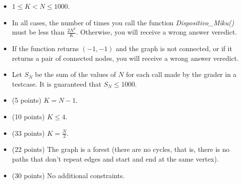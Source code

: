 \documentclass[12pt]{scrartcl}
\begin{document}
        \begin{itemize}
            \item $1 \le K < N \le 1000$.
            \item In all cases, the number of times you call the function \textit{Dispositivo\_Miku()} must be less than $\frac{2N^2}{K}$. Otherwise, you will receive a wrong answer veredict.
            \item If the function returns $(-1, -1)$ and the graph is not connected, or if it returns a pair of connected nodes, you will receive a wrong answer veredict.
            \item Let $S_N$ be the sum of the values of $N$ for each call made by the grader in a testcase. It is guaranteed that $S_N \le 1000$.
        \end{itemize}
    

    \begin{itemize}
        \item (5 points) $K = N - 1$.
        \item (10 points) $K \le 4$.
        \item (33 points) $K = \frac{N}{2}$.
        \item (22 points) The graph is a forest (there are no cycles, that is, there is no paths that don't repeat edges and start and end at the same vertex).
        \item (30 points) No additional constraints.
    \end{itemize}
\end{document}
